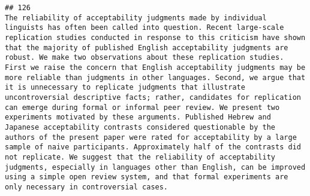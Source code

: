 \documentclass[
  english,
  man]{apa6}
\begin{document}
\begin{verbatim}
## 126                                                                                                                                                                                                                                                                                                                                                                                                                                                                                                                                                                                                                                                                                                                                                                                                                                                                                                                                                                                                                                                                                                                                                                                                                                                                                                                                                                                                                                                     The reliability of acceptability judgments made by individual linguists has often been called into question. Recent large-scale replication studies conducted in response to this criticism have shown that the majority of published English acceptability judgments are robust. We make two observations about these replication studies. First we raise the concern that English acceptability judgments may be more reliable than judgments in other languages. Second, we argue that it is unnecessary to replicate judgments that illustrate uncontroversial descriptive facts; rather, candidates for replication can emerge during formal or informal peer review. We present two experiments motivated by these arguments. Published Hebrew and Japanese acceptability contrasts considered questionable by the authors of the present paper were rated for acceptability by a large sample of naive participants. Approximately half of the contrasts did not replicate. We suggest that the reliability of acceptability judgments, especially in languages other than English, can be improved using a simple open review system, and that formal experiments are only necessary in controversial cases.

\end{verbatim}
\end{document}
